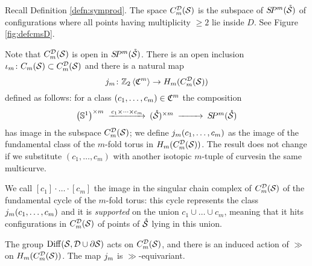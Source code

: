 % 
\begin{defn}
 \label{defn:cmsD}
 Recall Definition \ref{defn:symprod}.
 The space $C_{m}^{\mathcal{D}}(\mathcal{S})$ is the subspace of $S\!P^m(\mathring{\mathcal{S}})$ of configurations where all points
 having multiplicity $\geq 2$ lie inside $D$.
 See Figure \ref{fig:defcmsD}.
 
  Note that $C_{m}^{\mathcal{D}}(\mathcal{S})$ is open in $S\!P^m(\mathring{\mathcal{S}})$. There is an open inclusion $\iota_m\colon C_m(\mathcal{S})\subset C_{m}^{\mathcal{D}}(\mathcal{S})$ and there is a natural map
  \[
  j_m\colon \mathbb{Z}_2\left<\mathfrak{C}^{m}\right>\to H_m(C_{m}^{\mathcal{D}}(\mathcal{S}))
  \]
  defined as follows: for a class $(c_1,\dots,c_m)\in\mathfrak{C}^m$
  the composition
  \[
   \begin{CD}
    \pa{\Sone}^{\times m} @>c_1\times\dots\times c_m >> (\mrS)^{\times m} @>>> \SP^m(\mrS)
   \end{CD}
  \]
has image in the subspace $C_{m}^{\mathcal{D}}(\mathcal{S})$; we define $j_m(c_1,\dots,c_m)$ as the image
of the fundamental class
of the $m$-fold torus in $H_m(C_{m}^{\mathcal{D}}(\mathcal{S}))$. The result does not change
if we substitute $(c_1,\dots,c_m)$ with another isotopic $m$-tuple of curvesin the same multicurve.

We call $[c_1]\cdot\ldots\cdot[c_m]$ the image in the singular chain complex of $C_{m}^{\mathcal{D}}(\mathcal{S})$ of
the fundamental cycle of the
$m$-fold torus: this cycle represents the class $j_m(c_1,\dots,c_m)$ and it is \emph{supported}
on the union $c_1\cup\dots\cup c_m$, meaning that it hits configurations in $C_{m}^{\mathcal{D}}(\mathcal{S})$ of points of $\mathring{\mathcal{S}}$
lying in this union.

The group $\operatorname{Diff}(\mathcal{S},\mathcal{D}\cup\partial\mathcal{S})$ acts on $C_{m}^{\mathcal{D}}(\mathcal{S})$, and there is an induced action of $\gg$
on $H_m(C_{m}^{\mathcal{D}}(\mathcal{S}))$. The map $j_m$ is $\gg$-equivariant.
\end{defn}

